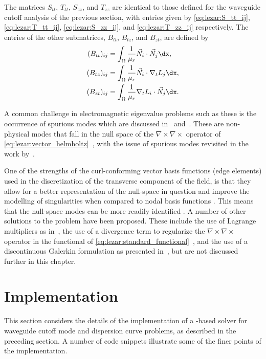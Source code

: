The matrices $S_{tt}$, $T_{tt}$, $S_{zz}$, and $T_{zz}$ are identical to
those defined for the waveguide cutoff analysis of the previous section,
with entries given by \eqref{eq:lezar:S_tt_ij}, \eqref{eq:lezar:T_tt_ij},
\eqref{eq:lezar:S_zz_ij}, and \eqref{eq:lezar:T_zz_ij} respectively. The
entries of the other submatrices, $B_{tt}$, $B_{tz}$, and $B_{zt}$,
are defined by
\begin{align}
\label{eq:lezar:B_tt_ij}
(B_{tt})_{ij} &=
\int_\Omega \frac{1}{\mu_r}\vec{N}_i\cdot\vec{N}_j \dx,\\
\label{eq:lezar:B_tz_ij}
(B_{tz})_{ij} &=
\int_\Omega \frac{1}{\mu_r}\vec{N}_i\cdot\nabla_t{L_j} \dx,\\
\label{eq:lezar:B_zt_ij}
(B_{zt})_{ij} &=
\int_\Omega \frac{1}{\mu_r}\nabla_t{L_i}\cdot\vec{N}_j \dx.
\end{align}

A common challenge in electromagnetic eigenvalue problems such as these is
the occurrence of spurious modes which are discussed in~\citet{Jin2002}
and~\citet{Davidson2011}. These are non-physical
modes that fall in the null space of the $\nabla\times{\nabla\times}$
operator of \eqref{eq:lezar:vector_helmholtz}~\citep{Bossavit1998},
with the issue of spurious modes revisited in the work
by~\citet{FernandesRaffetto2002}.

One of the strengths of the curl-conforming vector basis functions
(edge elements) used in the discretization of the transverse component
of the field, is that they allow for a better representation of the
null-space in question and improve the modelling of singularities when
compared to nodal basis functions \citep{Webb1993}. This means that the
null-space modes can be more readily identified \citep{Davidson2011,
Jin2002}. A number of other solutions to the problem have
been proposed. These include the use of Lagrange multipliers as
in~\citet{VardapetyanDemkowicz2002}, the use of a divergence term to
regularize the $\nabla\times{\nabla\times}$ operator in the functional
of \eqref{eq:lezar:standard_functional}~\citep{ConstableDauge2002},
and the use of a discontinuous Galerkin formulation as presented
in~\citet{BuffaHoustonPerugia2007}, but are not discussed further in
this chapter.

\section{Implementation}
\label{lezar:sec:Implementation}

This section considers the details of the implementation of a
\fenics-based solver for waveguide cutoff mode and dispersion
curve problems, as described in the preceding section.
A number of code snippets
illustrate some of the finer points of the implementation.

